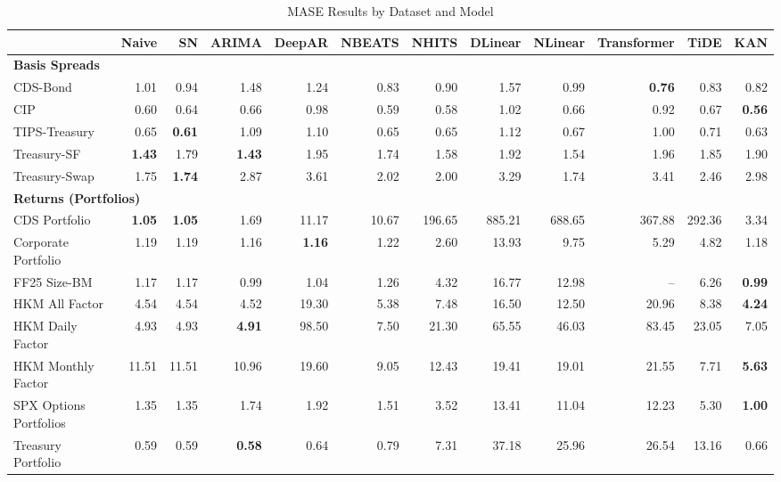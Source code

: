 
\begin{table}[htbp]
\centering
\caption{MASE Results by Dataset and Model}
\label{tab:mase_results}
\scriptsize
\setlength{\tabcolsep}{1.5pt}
\renewcommand{\arraystretch}{0.9}
\begin{tabular}{@{}lrrrrrrrrrrr@{}}
\toprule
 & Naive & SN & ARIMA & DeepAR & NBEATS & NHITS & DLinear & NLinear & Transformer & TiDE & KAN \\
\midrule
\multicolumn{12}{l}{\textbf{Basis Spreads}} \\
CDS-Bond & 1.01 & 0.94 & 1.48 & 1.24 & 0.83 & 0.90 & 1.57 & 0.99 & \textbf{0.76} & 0.83 & 0.82 \\
CIP & 0.60 & 0.64 & 0.66 & 0.98 & 0.59 & 0.58 & 1.02 & 0.66 & 0.92 & 0.67 & \textbf{0.56} \\
TIPS-Treasury & 0.65 & \textbf{0.61} & 1.09 & 1.10 & 0.65 & 0.65 & 1.12 & 0.67 & 1.00 & 0.71 & 0.63 \\
Treasury-SF & \textbf{1.43} & 1.79 & \textbf{1.43} & 1.95 & 1.74 & 1.58 & 1.92 & 1.54 & 1.96 & 1.85 & 1.90 \\
Treasury-Swap & 1.75 & \textbf{1.74} & 2.87 & 3.61 & 2.02 & 2.00 & 3.29 & 1.74 & 3.41 & 2.46 & 2.98 \\
\midrule
\multicolumn{12}{l}{\textbf{Returns (Portfolios)}} \\
CDS Portfolio & \textbf{1.05} & \textbf{1.05} & 1.69 & 11.17 & 10.67 & 196.65 & 885.21 & 688.65 & 367.88 & 292.36 & 3.34 \\
Corporate Portfolio & 1.19 & 1.19 & 1.16 & \textbf{1.16} & 1.22 & 2.60 & 13.93 & 9.75 & 5.29 & 4.82 & 1.18 \\
FF25 Size-BM & 1.17 & 1.17 & 0.99 & 1.04 & 1.26 & 4.32 & 16.77 & 12.98 & -- & 6.26 & \textbf{0.99} \\
HKM All Factor & 4.54 & 4.54 & 4.52 & 19.30 & 5.38 & 7.48 & 16.50 & 12.50 & 20.96 & 8.38 & \textbf{4.24} \\
HKM Daily Factor & 4.93 & 4.93 & \textbf{4.91} & 98.50 & 7.50 & 21.30 & 65.55 & 46.03 & 83.45 & 23.05 & 7.05 \\
HKM Monthly Factor & 11.51 & 11.51 & 10.96 & 19.60 & 9.05 & 12.43 & 19.41 & 19.01 & 21.55 & 7.71 & \textbf{5.63} \\
SPX Options Portfolios & 1.35 & 1.35 & 1.74 & 1.92 & 1.51 & 3.52 & 13.41 & 11.04 & 12.23 & 5.30 & \textbf{1.00} \\
Treasury Portfolio & 0.59 & 0.59 & \textbf{0.58} & 0.64 & 0.79 & 7.31 & 37.18 & 25.96 & 26.54 & 13.16 & 0.66 \\

\end{tabular}
\end{table}
